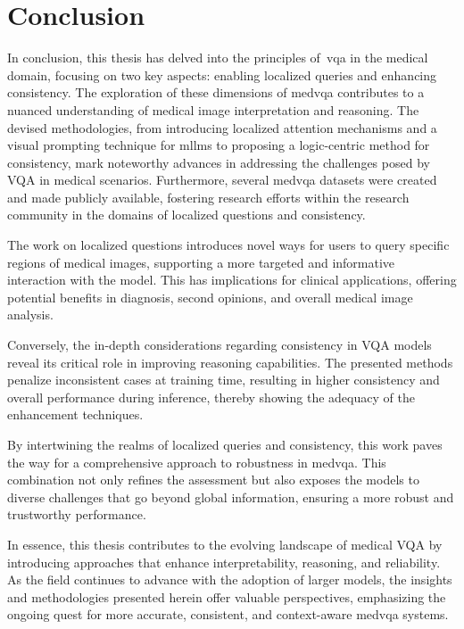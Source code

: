 \section{Conclusion}

In conclusion, this thesis has delved into the principles of~\gls{vqa} in the medical domain, focusing on two key aspects: enabling localized queries and enhancing consistency. The exploration of these dimensions of \gls{medvqa} contributes to a nuanced understanding of medical image interpretation and reasoning. The devised methodologies, from introducing localized attention mechanisms and a visual prompting technique for \glspl{mllm} to proposing a logic-centric method for consistency, mark noteworthy advances in addressing the challenges posed by VQA in medical scenarios. Furthermore, several \gls{medvqa} datasets were created and made publicly available, fostering research efforts within the research community in the domains of localized questions and consistency.

The work on localized questions introduces novel ways for users to query specific regions of medical images, supporting a more targeted and informative interaction with the model. This has implications for clinical applications, offering potential benefits in diagnosis, second opinions, and overall medical image analysis.

Conversely, the in-depth considerations regarding consistency in VQA models reveal its critical role in improving reasoning capabilities. The presented methods penalize inconsistent cases at training time, resulting in higher consistency and overall performance during inference, thereby showing the adequacy of the enhancement techniques.

By intertwining the realms of localized queries and consistency, this work paves the way for a comprehensive approach to robustness in \gls{medvqa}. This combination not only refines the assessment but also exposes the models to diverse challenges that go beyond global information, ensuring a more robust and trustworthy performance.

In essence, this thesis contributes to the evolving landscape of medical VQA by introducing approaches that enhance interpretability, reasoning, and reliability. As the field continues to advance with the adoption of larger models, the insights and methodologies presented herein offer valuable perspectives, emphasizing the ongoing quest for more accurate, consistent, and context-aware \gls{medvqa} systems.
 

